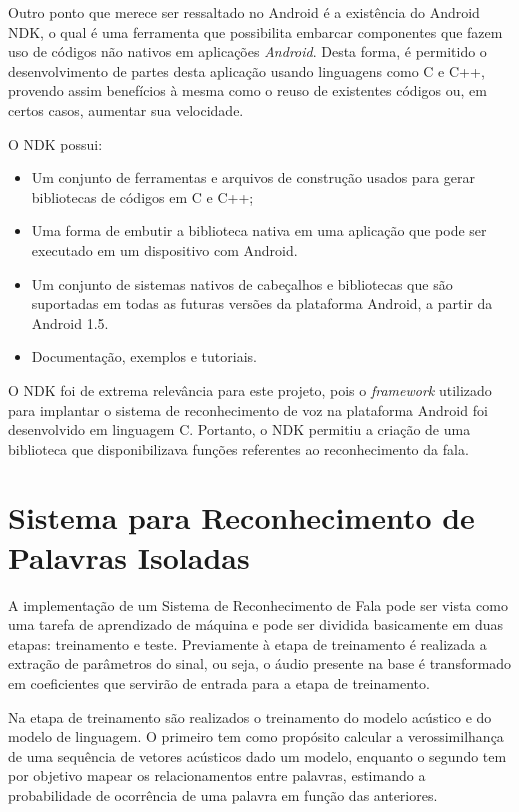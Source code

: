 \documentclass[12pt,a4paper,oneside]{report}
\begin{document}
Outro ponto que merece ser ressaltado no Android é a existência do Android NDK, o qual é uma ferramenta que possibilita embarcar componentes que fazem uso de códigos não nativos em aplicações \emph{Android}. Desta forma, é permitido o desenvolvimento de partes desta aplicação usando linguagens como C e C++, provendo assim benefícios à mesma como o reuso de existentes códigos ou, em certos casos, aumentar sua velocidade.

O NDK possui:
\begin{itemize}
\item Um conjunto de ferramentas e arquivos de construção usados para gerar bibliotecas de códigos em C e C++;
\item Uma forma de embutir a biblioteca nativa em uma aplicação que pode ser executado em um dispositivo com Android.
\item Um conjunto de sistemas nativos de cabeçalhos e bibliotecas que são suportadas em todas as futuras versões da plataforma Android, a partir da Android 1.5.
\item Documentação, exemplos e tutoriais.
\end{itemize}

O NDK foi de extrema relevância para este projeto, pois o \emph{framework} utilizado para implantar o sistema de reconhecimento de voz na plataforma Android foi desenvolvido em linguagem C. Portanto, o NDK permitiu a criação de uma biblioteca que disponibilizava funções referentes ao reconhecimento da fala.

\section{Sistema para Reconhecimento de Palavras Isoladas}

A implementação de um Sistema de Reconhecimento de Fala pode ser vista como uma tarefa de aprendizado de máquina e pode ser dividida basicamente em duas etapas: treinamento e teste. Previamente à etapa de treinamento é realizada a extração de parâmetros do sinal, ou seja, o áudio presente na base é transformado em coeficientes que servirão de entrada para a etapa de treinamento.

Na etapa de treinamento são realizados o treinamento do modelo acústico e do modelo de linguagem. O primeiro tem como propósito calcular a verossimilhança de uma sequência de vetores acústicos dado um modelo, enquanto o segundo tem por objetivo mapear os relacionamentos entre palavras, estimando a probabilidade de ocorrência de uma palavra em função das anteriores.
\end{document}
